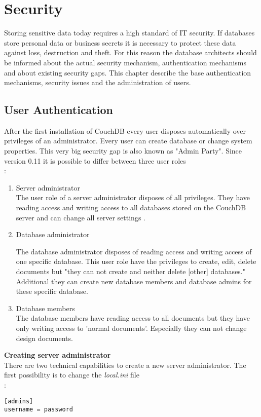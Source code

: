 \section{Security}

Storing sensitive data today requires a high standard of IT security. If databases store personal data or business secrets it is necessary to protect these data against loss, destruction and theft. For this reason the  database architects  should be informed about the actual security mechanism, authentication mechanisms and about existing security gaps. This chapter describe the base authentication mechanisms, security issues and the administration of users.

\subsection{User Authentication}
After the first installation of CouchDB every user disposes automatically over privileges of an administrator. Every user can create database or change system properties. This very big security gap is also known as "Admin Party". Since version 0.11 it is possible to differ between three user roles \\ \cite{ApacheSoftwareFoundation.2013.SecurityFeatures}:
\begin{enumerate}
\item Server administrator \\
The user role of a server administrator disposes of all privileges. They have reading access and writing access to all databases stored on the CouchDB server and can change all server settings \cite{Anderson.2010.Buch}.
\item Database administrator

The database administrator disposes of reading access and writing access of one specific database. This user role have the privileges to create, edit, delete documents but "they can not create and neither delete [other] databases." \cite{ApacheSoftwareFoundation.2013.SecurityFeatures}
Additional they can create new database members and database admins for these specific database.
\item Database members \\
The database members have reading access to all documents but they have only writing access to 'normal documents'. Especially they can not change design documents.
\end{enumerate}
\textbf{Creating server administrator}\\
There are two technical capabilities to create a new server administrator. The first possibility is to change the \textit{local.ini} file \\ \cite{ApacheSoftwareFoundation.2013.AdminAccount}:
\begin{lstlisting}[frame=single, caption=Example Create new Server Administrator with local.in File \protect\cite{ApacheSoftwareFoundation.2013.AdminAccount}]
[admins]
username = password
\end{lstlisting}

